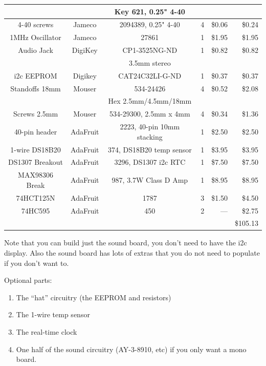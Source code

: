 \documentclass[11pt]{article}
\begin{document}
\begin{table}
\begin{tabular}{|c|c|c|c|r|r|}
		&		& Key 621, 0.25" 4-40	  &	&          &         \\
\hline
4-40 screws	& Jameco	& 2094389, 0.25" 4-40	  & 4	&  \$0.06  &  \$0.24 \\
\hline
1MHz Oscillator	& Jameco	& 27861			  & 1	& \$1.95   &  \$1.95 \\
\hline
Audio Jack	& DigiKey	& CP1-3525NG-ND	          & 1	&  \$0.82  &  \$0.82 \\
		&		& 3.5mm stereo		  &	&	   &	     \\
\hline
i2c EEPROM	& Digikey 	& CAT24C32LI-G-ND         & 1 	& \$0.37   &  \$0.37 \\
\hline
Standoffs 18mm	& Mouser	& 534-24426		  & 4   &  \$0.52  &  \$2.08 \\
		&		& Hex 2.5mm/4.5mm/18mm	  &	&	   &	     \\
\hline
Screws 2.5mm	& Mouser	& 534-29300, 2.5mm x 4mm  & 4   &  \$0.34  &  \$1.36 \\
\hline
40-pin header	& AdaFruit	& 2223, 40-pin 10mm stacking & 1	&  \$2.50  &  \$2.50 \\
\hline
1-wire DS18B20	& AdaFruit	& 374, DS18B20 temp sensor& 1	&  \$3.95  &  \$3.95 \\
\hline
DS1307 Breakout	& AdaFruit	& 3296, DS1307 i2c RTC	  & 1	&  \$7.50  &  \$7.50 \\
\hline
MAX98306 Break	& AdaFruit	& 987, 3.7W Class D Amp   & 1	&  \$8.95  &  \$8.95 \\
\hline
74HCT125N	& AdaFruit	& 1787			  & 3	&  \$1.50  &  \$4.50 \\
\hline
74HC595		& AdaFruit	& 450			  & 2	&  ---     &  \$2.75 \\
\hline
\hline
		&		&		&	&		& \$105.13 \\
\hline
\end{tabular}
\end{table}

Note that you can build just the sound board, you don't need to have the i2c display.
Also the sound board has lots of extras that you do not need to populate if you don't want to.

Optional parts:
\begin{enumerate}
	\item The ``hat'' circuitry (the EEPROM and resistors)
	\item The 1-wire temp sensor
	\item The real-time clock
	\item One half of the sound circuitry (AY-3-8910, etc) if you only want
		a mono board.
\end{enumerate}
\end{document}
